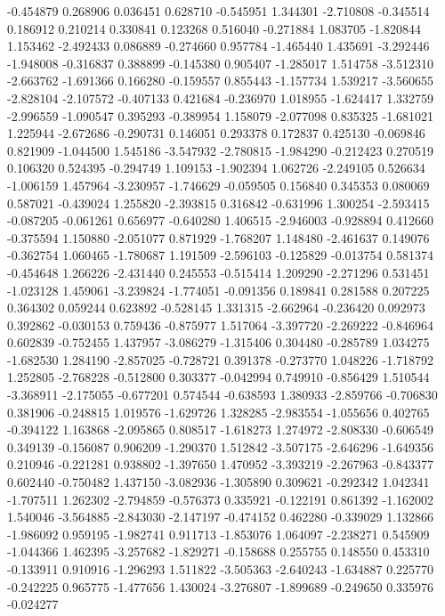 -0.454879
0.268906
0.036451
0.628710
-0.545951
1.344301
-2.710808
-0.345514
0.186912
0.210214
0.330841
0.123268
0.516040
-0.271884
1.083705
-1.820844
1.153462
-2.492433
0.086889
-0.274660
0.957784
-1.465440
1.435691
-3.292446
-1.948008
-0.316837
0.388899
-0.145380
0.905407
-1.285017
1.514758
-3.512310
-2.663762
-1.691366
0.166280
-0.159557
0.855443
-1.157734
1.539217
-3.560655
-2.828104
-2.107572
-0.407133
0.421684
-0.236970
1.018955
-1.624417
1.332759
-2.996559
-1.090547
0.395293
-0.389954
1.158079
-2.077098
0.835325
-1.681021
1.225944
-2.672686
-0.290731
0.146051
0.293378
0.172837
0.425130
-0.069846
0.821909
-1.044500
1.545186
-3.547932
-2.780815
-1.984290
-0.212423
0.270519
0.106320
0.524395
-0.294749
1.109153
-1.902394
1.062726
-2.249105
0.526634
-1.006159
1.457964
-3.230957
-1.746629
-0.059505
0.156840
0.345353
0.080069
0.587021
-0.439024
1.255820
-2.393815
0.316842
-0.631996
1.300254
-2.593415
-0.087205
-0.061261
0.656977
-0.640280
1.406515
-2.946003
-0.928894
0.412660
-0.375594
1.150880
-2.051077
0.871929
-1.768207
1.148480
-2.461637
0.149076
-0.362754
1.060465
-1.780687
1.191509
-2.596103
-0.125829
-0.013754
0.581374
-0.454648
1.266226
-2.431440
0.245553
-0.515414
1.209290
-2.271296
0.531451
-1.023128
1.459061
-3.239824
-1.774051
-0.091356
0.189841
0.281588
0.207225
0.364302
0.059244
0.623892
-0.528145
1.331315
-2.662964
-0.236420
0.092973
0.392862
-0.030153
0.759436
-0.875977
1.517064
-3.397720
-2.269222
-0.846964
0.602839
-0.752455
1.437957
-3.086279
-1.315406
0.304480
-0.285789
1.034275
-1.682530
1.284190
-2.857025
-0.728721
0.391378
-0.273770
1.048226
-1.718792
1.252805
-2.768228
-0.512800
0.303377
-0.042994
0.749910
-0.856429
1.510544
-3.368911
-2.175055
-0.677201
0.574544
-0.638593
1.380933
-2.859766
-0.706830
0.381906
-0.248815
1.019576
-1.629726
1.328285
-2.983554
-1.055656
0.402765
-0.394122
1.163868
-2.095865
0.808517
-1.618273
1.274972
-2.808330
-0.606549
0.349139
-0.156087
0.906209
-1.290370
1.512842
-3.507175
-2.646296
-1.649356
0.210946
-0.221281
0.938802
-1.397650
1.470952
-3.393219
-2.267963
-0.843377
0.602440
-0.750482
1.437150
-3.082936
-1.305890
0.309621
-0.292342
1.042341
-1.707511
1.262302
-2.794859
-0.576373
0.335921
-0.122191
0.861392
-1.162002
1.540046
-3.564885
-2.843030
-2.147197
-0.474152
0.462280
-0.339029
1.132866
-1.986092
0.959195
-1.982741
0.911713
-1.853076
1.064097
-2.238271
0.545909
-1.044366
1.462395
-3.257682
-1.829271
-0.158688
0.255755
0.148550
0.453310
-0.133911
0.910916
-1.296293
1.511822
-3.505363
-2.640243
-1.634887
0.225770
-0.242225
0.965775
-1.477656
1.430024
-3.276807
-1.899689
-0.249650
0.335976
-0.024277
